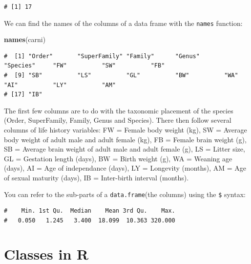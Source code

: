 \documentclass[
  a4paperpaper,
]{book}
\newenvironment{Shaded}{\begin{snugshade}}{\end{snugshade}}
\newcommand{\KeywordTok}[1]{\textcolor[rgb]{0.13,0.29,0.53}{\textbf{#1}}}
\newcommand{\NormalTok}[1]{#1}
\newcommand{\OperatorTok}[1]{\textcolor[rgb]{0.81,0.36,0.00}{\textbf{#1}}}
\begin{document}
\begin{verbatim}
# [1] 17
\end{verbatim}

We can find the names of the columns of a data frame with the \texttt{names} function:

\begin{Shaded}
\begin{Highlighting}[]
\KeywordTok{names}\NormalTok{(carni)}
\end{Highlighting}
\end{Shaded}

\begin{verbatim}
#  [1] "Order"       "SuperFamily" "Family"      "Genus"       "Species"     "FW"          "SW"          "FB"         
#  [9] "SB"          "LS"          "GL"          "BW"          "WA"          "AI"          "LY"          "AM"         
# [17] "IB"
\end{verbatim}

The first few columns are to do with the taxonomic placement of the species (Order, SuperFamily, Family, Genus and Species). There then follow several columns of life history variables: FW = Female body weight (kg),
SW = Average body weight of adult male and adult female (kg), FB = Female brain weight (g), SB = Average brain weight of adult male and adult female (g), LS = Litter size, GL = Gestation length (days), BW = Birth weight (g), WA = Weaning age (days), AI = Age of independance (days), LY = Longevity (months), AM = Age of sexual maturity (days), IB = Inter-birth interval (months).

You can refer to the sub-parts of a \texttt{data.frame}(the columns) using the \texttt{\$} syntax:

\begin{Shaded}
\end{Shaded}

\begin{verbatim}
#    Min. 1st Qu.  Median    Mean 3rd Qu.    Max. 
#   0.050   1.245   3.400  18.099  10.363 320.000
\end{verbatim}

\hypertarget{classes-in-r}{%
\section{Classes in R}\label{classes-in-r}}
\end{document}
